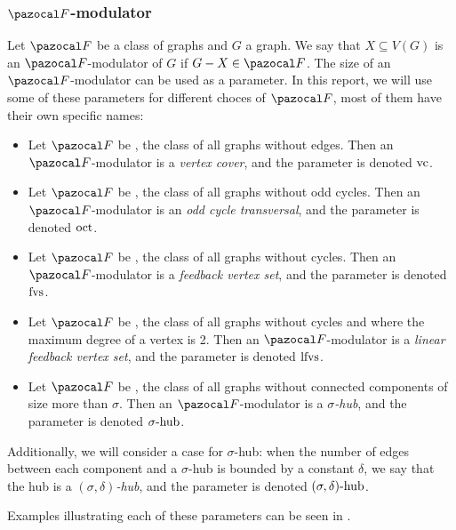 

\subsubsection*{$\F$-modulator}

Let $\F$ be a class of graphs and $G$ a graph. We say that $X \subseteq V(G)$ is an $\F$-modulator of $G$ if $G - X \in \F$. The size of an $\F$-modulator can be used as a parameter. In this report, we will use some of these parameters for different choces of $\F$, most of them have their own specific names:

\begin{itemize}
    \item Let $\F$ be , the class of all graphs without edges. Then an $\F$-modulator is a \textit{vertex cover}, and the parameter is denoted $\text{vc}$.
    \item Let $\F$ be , the class of all graphs without odd cycles. Then an $\F$-modulator is an \textit{odd cycle transversal}, and the parameter is denoted $\text{oct}$.
    \item Let $\F$ be , the class of all graphs without cycles. Then an $\F$-modulator is a \textit{feedback vertex set}, and the parameter is denoted $\text{fvs}$.
    \item Let $\F$ be , the class of all graphs without cycles and where the maximum degree of a vertex is 2. Then an $\F$-modulator is a \textit{linear feedback vertex set}, and the parameter is denoted $\text{lfvs}$.
    \item Let $\F$ be , the class of all graphs without connected components of size more than $\sigma$. Then an $\F$-modulator is a \textit{$\sigma$-hub}, and the parameter is denoted $\sigma\text{-hub}$.
\end{itemize}

\medskip

Additionally, we will consider a case for $\sigma$-hub: when the number of edges between each component and a $\sigma$-hub is bounded by a constant $\delta$, we say that the hub is a \textit{$(\sigma, \delta)$-hub}, and the parameter is denoted $(\sigma, \delta)\text{-hub}$.

Examples illustrating each of these parameters can be seen in .



\medskip

